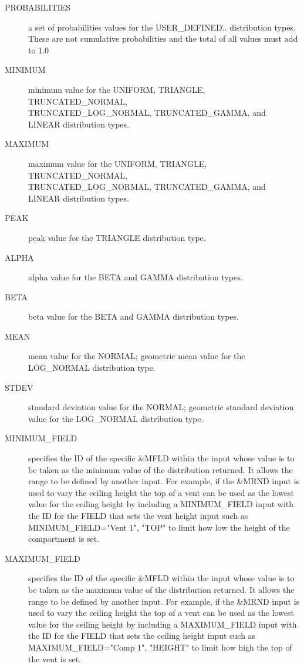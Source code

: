 \documentclass[12pt,twoside]{book}
\begin{document}
\begin{description}
  \item[PROBABILITIES] a set of probabilities values for the {\ct USER\_DEFINED\...} distribution types. These are not cumulative probabilities and the total of all values must add to 1.0
  \item[MINIMUM] minimum value for the {\ct UNIFORM}, {\ct TRIANGLE}, {\ct TRUNCATED\_NORMAL}, \\
      {\ct TRUNCATED\_LOG\_NORMAL}, {\ct TRUNCATED\_GAMMA}, and {\ct LINEAR} distribution types.
  \item[MAXIMUM] maximum value for the {\ct UNIFORM}, {\ct TRIANGLE}, {\ct TRUNCATED\_NORMAL}, \\
      {\ct TRUNCATED\_LOG\_NORMAL}, {\ct TRUNCATED\_GAMMA}, and {\ct LINEAR} distribution types.
  \item[PEAK] peak value for the {\ct TRIANGLE} distribution type.
  \item[ALPHA] alpha value for the {\ct BETA} and {\ct GAMMA} distribution types.
  \item[BETA] beta value for the {\ct BETA} and {\ct GAMMA} distribution types.
  \item[MEAN] mean value for the {\ct NORMAL}; geometric mean value for the {\ct LOG\_NORMAL} distribution type.
  \item[STDEV] standard deviation value for the {\ct NORMAL}; geometric standard deviation value for the {\ct LOG\_NORMAL} distribution type.
  \item[MINIMUM\_FIELD] specifies the ID of the specific \&MFLD within the input whose value is to be taken as the minimum value of the distribution returned. It allows the range to be defined by another input. For example, if the {\ct \&MRND} input is used to vary the ceiling height the top of a vent can be used as the lowest value for the ceiling height by including a {\ct MINIMUM\_FIELD} input with the {\ct ID} for the {\ct FIELD} that sets the vent height input such as {\ct MINIMUM\_FIELD="Vent 1", "TOP"} to limit how low the height of the compartment is set.
  \item[MAXIMUM\_FIELD] specifies the  ID of the specific \&MFLD  within the input whose value is to be taken as the maximum value of the distribution returned. It allows the range to be defined by another input. For example, if the {\ct \&MRND} input is used to vary the ceiling height the top of a vent can be used as the lowest value for the ceiling height by including a {\ct MAXIMUM\_FIELD} input with the {\ct ID} for the {\ct FIELD} that sets the ceiling height input such as {\ct MAXIMUM\_FIELD="Comp 1", "HEIGHT"} to limit how high the top of the vent is set.

\end{description}
\end{document}
